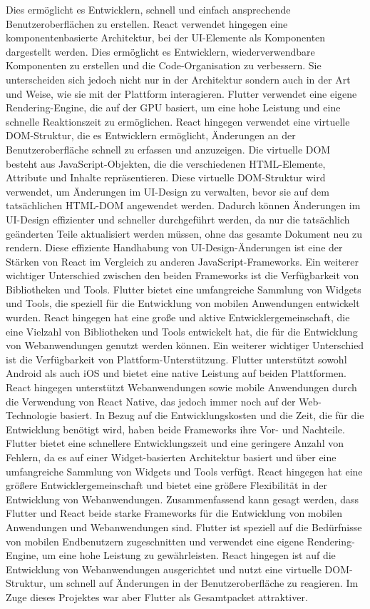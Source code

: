 Dies ermöglicht es Entwicklern, schnell und einfach ansprechende Benutzeroberflächen zu erstellen. 
React verwendet hingegen eine komponentenbasierte Architektur, bei der UI-Elemente als Komponenten dargestellt werden.
Dies ermöglicht es Entwicklern, wiederverwendbare Komponenten zu erstellen und die Code-Organisation zu verbessern.
Sie unterscheiden sich jedoch nicht nur in der Architektur sondern auch in der Art und Weise, wie sie mit der Plattform interagieren. 
Flutter verwendet eine eigene Rendering-Engine, die auf der GPU basiert, um eine hohe Leistung und eine schnelle Reaktionszeit zu ermöglichen.
React hingegen verwendet eine virtuelle DOM-Struktur, die es Entwicklern ermöglicht, Änderungen an der Benutzeroberfläche schnell zu erfassen und anzuzeigen. 
Die virtuelle DOM besteht aus JavaScript-Objekten, die die verschiedenen HTML-Elemente, Attribute und Inhalte repräsentieren. 
Diese virtuelle DOM-Struktur wird verwendet, um Änderungen im UI-Design zu verwalten, bevor sie auf dem tatsächlichen HTML-DOM angewendet werden. 
Dadurch können Änderungen im UI-Design effizienter und schneller durchgeführt werden, da nur die tatsächlich geänderten Teile aktualisiert werden müssen, ohne das gesamte Dokument neu zu rendern. 
Diese effiziente Handhabung von UI-Design-Änderungen ist eine der Stärken von React im Vergleich zu anderen JavaScript-Frameworks.
Ein weiterer wichtiger Unterschied zwischen den beiden Frameworks ist die Verfügbarkeit von Bibliotheken und Tools. Flutter bietet eine umfangreiche Sammlung von Widgets und Tools, die speziell für die Entwicklung von mobilen Anwendungen entwickelt wurden. 
React hingegen hat eine große und aktive Entwicklergemeinschaft, die eine Vielzahl von Bibliotheken und Tools entwickelt hat, die für die Entwicklung von Webanwendungen genutzt werden können.
Ein weiterer wichtiger Unterschied ist die Verfügbarkeit von Plattform-Unterstützung. 
Flutter unterstützt sowohl Android als auch iOS und bietet eine native Leistung auf beiden Plattformen. 
React hingegen unterstützt Webanwendungen sowie mobile Anwendungen durch die Verwendung von React Native, das jedoch immer noch auf der Web-Technologie basiert.
In Bezug auf die Entwicklungskosten und die Zeit, die für die Entwicklung benötigt wird, haben beide Frameworks ihre Vor- und Nachteile. 
Flutter bietet eine schnellere Entwicklungszeit und eine geringere Anzahl von Fehlern, da es auf einer Widget-basierten Architektur basiert und über eine umfangreiche Sammlung von Widgets und Tools verfügt. 
React hingegen hat eine größere Entwicklergemeinschaft und bietet eine größere Flexibilität in der Entwicklung von Webanwendungen.
Zusammenfassend kann gesagt werden, dass Flutter und React beide starke Frameworks für die Entwicklung von mobilen Anwendungen und Webanwendungen sind. 
Flutter ist speziell auf die Bedürfnisse von mobilen Endbenutzern zugeschnitten und verwendet eine eigene Rendering-Engine, um eine hohe Leistung zu gewährleisten. 
React hingegen ist auf die Entwicklung von Webanwendungen ausgerichtet und nutzt eine virtuelle DOM-Struktur, um schnell auf Änderungen in der Benutzeroberfläche zu reagieren. 
Im Zuge dieses Projektes war aber Flutter als Gesamtpacket attraktiver.

